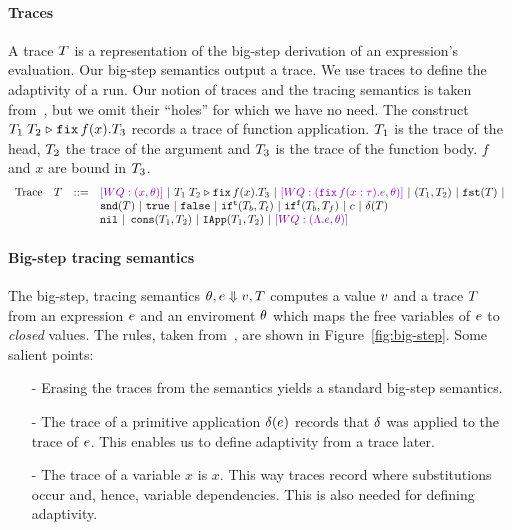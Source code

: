 \documentclass[a4paper,11pt]{article}
\newcommand{\wq}[1]{\textcolor[rgb]{.50,0.0,0.7}{[WQ: #1]}}
\theoremstyle{definition}
\begin{document}
\paragraph{Traces}
A trace $T$ is a representation of the big-step derivation of an
expression's evaluation. Our big-step semantics output a trace. We use
traces to define the adaptivity of a run. Our notion of traces and the
tracing semantics is taken from~\cite[Section 4]{perera:dep}, but we
omit their ``holes'' for which we have no need. The construct
$T_1 \; T_2 \mathrel{\triangleright} {\mathop{\mathtt{fix}} f(x).T_3}$ records a trace of function
application. $T_1$ is the trace of the head, $T_2$ the trace of
the argument and $T_3$ is the trace of the function body. $f$ and
$x$ are bound in $T_3$.
%
\[\begin{array}{llll}
\mbox{Trace} & \tr & ::= & \wq{(x, \env)} ~|~ \trapp{\tr_1}{\tr_2}{f}{x}{\tr_3} ~|~
\wq{ (\trfix f(x:\type).e, \env) } ~|~ (\tr_1, \tr_2) ~|~ \trprojl(\tr) ~|\\ 
%
& & & \trprojr(\tr) ~|~ \trtrue ~|~ \trfalse ~|~ \trift(\tr_b, \tr_t)
~|~ \triff(\tr_b, \tr_f) ~|~ \trconst ~|~ \trop(\tr) \\
%
& & & \trnil ~|~ \trcons (\tr_1, \tr_2) ~|~ \triapp{\tr_1}{\tr_2} ~|~
      \wq {(\eilam \expr, \env)}
\end{array}\]


\paragraph{Big-step tracing semantics}
The big-step, tracing semantics $\theta, e \mathrel{\Downarrow} v, T$
computes a value $v$ and a trace $T$ from an expression $e$
and an enviroment $\theta$ which maps the free variables of $e$ to
\emph{closed} values. The rules, taken from~\cite{perera:dep}, are
shown in Figure~\ref{fig:big-step}. Some salient points:
\begin{itemize}
\item[-] Erasing the traces from the semantics yields a standard
  big-step semantics.
\item[-] The trace of a primitive application $\delta(e)$
  records that $\delta$ was applied to the trace of
  $e$. This enables us to define adaptivity from a trace later.
\item[-] The trace of a variable $x$ is $x$. This way traces record
  where substitutions occur and, hence, variable dependencies. This is
  also needed for defining adaptivity.
\end{itemize}
\end{document}
